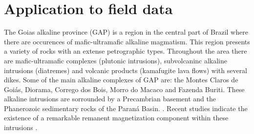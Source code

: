 \section{Application to field data}
\label{sec:real_application}

The Goias alkaline province (GAP) is a region in the central part of Brazil where there are occurences of mafic-ultramafic alkaline magmatism. This region presents a variety of rocks with an extense petrographic types. Throughout the area there are mafic-ultramafic complexes (plutonic intrusions), subvolcaninc alkaline intrusions (diatremes) and volcanic products (kamafugite lava flows) with several dikes. Some of the main alkaline complexes of GAP are: the Montes Claros de Goi\'as, Diorama, Corrego dos Bois, Morro do Macaco and Fazenda Buriti. These alkaline intrusions are sorrounded by a Precambrian basement and the Phanerozoic sedimentary rocks of the Paran\'a Basin. \citep{junqueira_brod_2005,carlson_etal_2007,marangoni_mantovani_2013,dutra_etal_2014}. Recent studies indicate the existence of a remarkable remanent magnetization component within these intrusions \citep{marangoni_mantovani_2013,oliveirajr_etal_2015,marangoni_etal_2016,zhang_etal_2018}. 

